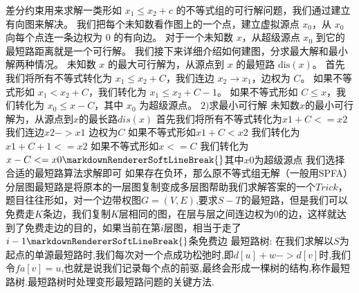 {}
\markdownRendererSectionEnd \markdownRendererSectionBegin
{}\markdownRendererInterblockSeparator
{}差分约束用来求解一类形如 $x_1 \le x_2 + c$ 的不等式组的可行解问题，我们通过建立有向图来解决。\markdownRendererParagraphSeparator
{}我们把每个未知数看作图上的一个点，建立虚拟源点 $x_0$，从 $x_0$ 向每个点连一条边权为 $0$ 的有向边。\markdownRendererHardLineBreak
{}对于一个未知数 $x$，从超级源点 $x_0$ 到它的最短路距离就是一个可行解。\markdownRendererParagraphSeparator
{}我们接下来详细介绍如何建图，分求最大解和最小解两种情况。\markdownRendererParagraphSeparator
{}\markdownRendererHardLineBreak
{}未知数 $x$ 的最大可行解为，从源点到 $x$ 的最短路 $\mathrm{dis}(x)$。\markdownRendererHardLineBreak
{}首先我们将所有不等式转化为 $x_1 \le x_2 + C$，我们连边 $x_2 \to x_1$，边权为 $C$。\markdownRendererHardLineBreak
{}如果不等式形如 $x_1 < x_2 + C$，我们转化为 $x_1 \le x_2 + C - 1$。\markdownRendererHardLineBreak
{}如果不等式形如 $C \le x$，我们转化为 $x_0 \le x - C$，其中 $x_0$ 为超级源点。\markdownRendererParagraphSeparator
{}$ 2) $求最小可行解\markdownRendererParagraphSeparator
{}未知数$ x $的最小可行解为，从源点到$ x $的最长路$ dis(x) $\markdownRendererParagraphSeparator
{}首先我们将所有不等式转化为$ x1+C<=x2 $ 我们连边$ x2->x1 $ 边权为$ C $\markdownRendererParagraphSeparator
{}如果不等式形如$ x1+C<x2 $ 我们转化为$ x1+C+1<=x2 $\markdownRendererParagraphSeparator
{}如果不等式形如$ x<=C $ 我们转化为$ x-C<=x0\markdownRendererSoftLineBreak
{}$其中$ x0 $为超级源点\markdownRendererParagraphSeparator
{}我们选择合适的最短路算法求解即可 如果存在负环，那么原不等式组无解（一般用SPFA）\markdownRendererInterblockSeparator
{}
\markdownRendererSectionEnd \markdownRendererSectionBegin
{}\markdownRendererInterblockSeparator
{}分层图最短路是将原本的一层图复制变成多层图帮助我们求解答案的一个$ Trick $，题目往往形如，对一个边带权图$ G=(V,E) $,要求$ S-T $的最短路，但是我们可以免费走$ K $条边，我们复制$ K $层相同的图，在层与层之间连边权为$ 0 $的边，这样就达到了免费走边的目的，如果当前在第$ i $层图，相当于走了$ i-1\markdownRendererSoftLineBreak
{}$条免费边\markdownRendererInterblockSeparator
{}
\markdownRendererSectionEnd \markdownRendererSectionBegin
{}\markdownRendererInterblockSeparator
{}最短路树:\markdownRendererParagraphSeparator
{}在我们求解以$ S $为起点的单源最短路时,我们每次对一个点成功松弛时,即$ d[u]+w->d[v] $时,我们令$ fa[v]=u $,也就是说我们记录每个点的前驱,最终会形成一棵树的结构,称作最短路树.最短路树时处理变形最短路问题的关键方法.\markdownRendererParagraphSeparator
